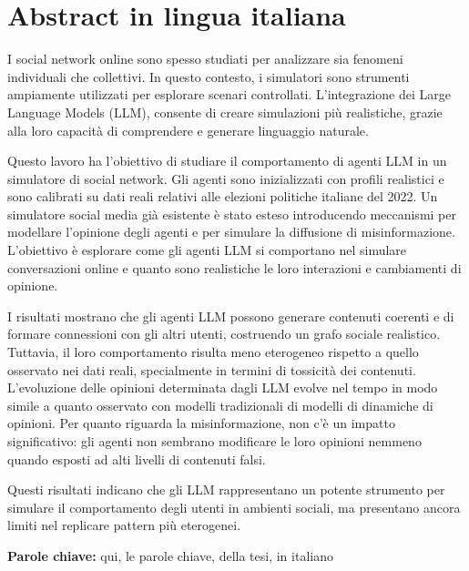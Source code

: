 \section*{Abstract in lingua italiana}
I social network online sono spesso studiati per analizzare sia fenomeni individuali che collettivi. 
In questo contesto, i simulatori sono strumenti ampiamente utilizzati per esplorare scenari controllati.
L’integrazione dei Large Language Models (LLM), consente di creare simulazioni più realistiche, grazie alla loro capacità di comprendere e generare linguaggio naturale.

Questo lavoro ha l’obiettivo di studiare il comportamento di agenti LLM in un simulatore di social network.
Gli agenti sono inizializzati con profili realistici e sono calibrati su dati reali relativi alle elezioni politiche italiane del 2022.
Un simulatore social media già esistente è stato esteso introducendo meccanismi per modellare l’opinione degli agenti e per simulare la diffusione di misinformazione.
L’obiettivo è esplorare come gli agenti LLM si comportano nel simulare conversazioni online e quanto sono realistiche le loro interazioni e cambiamenti di opinione.

I risultati mostrano che gli agenti LLM possono generare contenuti coerenti e di formare connessioni con gli altri utenti, costruendo un grafo sociale realistico.
Tuttavia, il loro comportamento risulta meno eterogeneo rispetto a quello osservato nei dati reali, specialmente in termini di tossicità dei contenuti.
L’evoluzione delle opinioni determinata dagli LLM evolve nel tempo in modo simile a quanto osservato con modelli tradizionali di modelli di dinamiche di opinioni.
Per quanto riguarda la misinformazione, non c’è un impatto significativo: gli agenti non sembrano modificare le loro opinioni nemmeno quando esposti ad alti livelli di contenuti falsi.

Questi risultati indicano che gli LLM rappresentano un potente strumento per simulare il comportamento degli utenti in ambienti sociali, ma presentano ancora limiti nel replicare pattern più eterogenei.

\vspace{15pt}
\begin{tcolorbox}[arc=0pt, boxrule=0pt, colback=bluePoli!60, width=\textwidth, colupper=white]
    \textbf{Parole chiave:} qui, le parole chiave, della tesi, in italiano 
\end{tcolorbox}